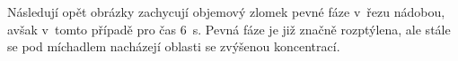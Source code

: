 \vspace{-9mm}

\newpage

Následují opět obrázky zachycují objemový zlomek pevné fáze v~řezu nádobou, avšak v~tomto případě pro čas \SI{6}{\second}. Pevná fáze je již značně rozptýlena, ale stále se pod míchadlem nacházejí oblasti se zvýšenou koncentrací.

\begin{figure}[h!]
  \centering
  \qquad             

\end{figure}
